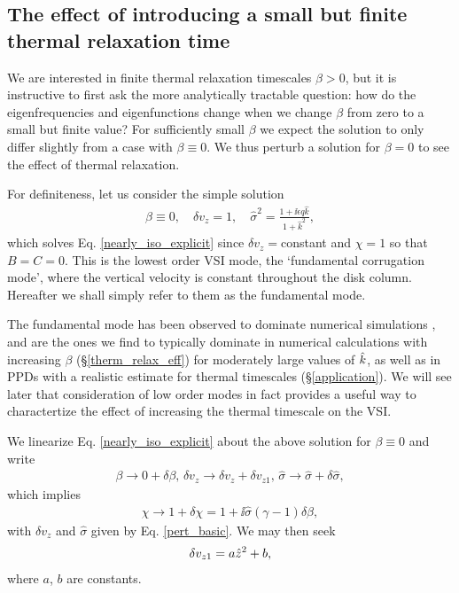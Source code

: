 \subsection{The effect of introducing a small but finite
  thermal relaxation time}\label{relax_pert}
We are interested in finite thermal relaxation
timescales $\beta > 0$, but it is instructive to
first ask  the more analytically tractable question: how 
do the eigenfrequencies and eigenfunctions change when we change
$\beta$ from zero to a small but finite value? For 
sufficiently small $\beta$ we expect the solution to only differ
slightly from a case with $\beta\equiv 0$. We thus perturb a solution
for $\beta=0$ to see the effect of thermal relaxation.  

For definiteness, let us consider the simple solution 
\begin{align}
  \beta\equiv 0, \quad \delta v_z = 1,\quad \hat{\sigma}^2 = \frac{1 +
  \ii\epsilon q \hat{k}}{1+\hat{k}^2}, \label{pert_basic} 
\end{align}
which solves Eq. \ref{nearly_iso_explicit} since $\delta
v_z=$constant and $\chi=1$ so that $B=C=0$. 
This is the lowest order VSI mode, the `fundamental corrugation mode',
where the vertical velocity is constant throughout the disk
column. Hereafter we shall simply refer to them as the fundamental
mode. 

The fundamental mode has been observed to dominate numerical simulations
\citep[]{stoll14}, and are the ones we find to typically 
dominate in numerical calculations with increasing $\beta$
(\S\ref{therm_relax_eff}) for moderately large    
values of $\hat{k}$, as well as in PPDs 
with a realistic estimate for thermal timescales
(\S\ref{application}). We will see later that consideration of low
order modes in fact provides a useful way to charactertize the effect
of increasing the thermal timescale on the VSI. 

We linearize Eq. \ref{nearly_iso_explicit} about the above
solution for $\beta\equiv0$ and write 
\begin{align}\label{nearly_iso_pert}
  \beta \to 0 + \delta\beta,\, \delta v_z\to \delta v_z+\delta
  v_{z1},\,\hat{\sigma} \to \hat{\sigma} + \delta\hat{\sigma}, 
\end{align}
which implies 
\begin{align}
  \chi \to 1 + \delta\chi = 1 + \ii \hat{\sigma}\left(\gamma-1\right)\delta\beta,
\end{align}
with $\delta v_z$ and $\hat{\sigma}$ given by Eq. \ref{pert_basic}. We
may then seek  
\begin{align}
  \delta v_{z1} = a \hat{z}^2 + b,
\end{align}
where $a$, $b$ are constants. 

